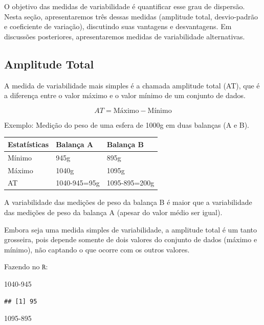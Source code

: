 \documentclass[
]{book}
\newenvironment{Shaded}{\begin{snugshade}}{\end{snugshade}}
\newcommand{\DecValTok}[1]{\textcolor[rgb]{0.00,0.00,0.81}{#1}}
\begin{document}
O objetivo das medidas de variabilidade é quantificar esse grau de dispersão. Nesta seção, apresentaremos três dessas medidas (amplitude total, desvio-padrão e coeficiente de variação), discutindo suas vantagens e desvantagens. Em discussões posteriores, apresentaremos medidas de variabilidade alternativas.

\hypertarget{amplitude-total}{%
\subsection{Amplitude Total}\label{amplitude-total}}

A medida de variabilidade mais simples é a chamada amplitude total (AT), que é a diferença entre o valor máximo e o valor mínimo de um conjunto de dados.

\begin{equation*}
AT = \text{Máximo}-\text{Mínimo}
\end{equation*}

Exemplo: Medição do peso de uma esfera de 1000g em duas balanças (A e B).

\begin{longtable}[]{@{}lll@{}}
\toprule
Estatísticas & Balança A & Balança B \\
\midrule
\endhead
Mínimo & 945g & 895g \\
Máximo & 1040g & 1095g \\
AT & 1040-945=95g & 1095-895=200g \\
\bottomrule
\end{longtable}

A variabilidade das medições de peso da balança B é maior que a variabilidade das medições de peso da balança A (apesar do valor médio ser igual).

Embora seja uma medida simples de variabilidade, a amplitude total é um tanto grosseira, pois depende somente de dois valores do conjunto de dados (máximo e mínimo), não captando o que ocorre com os outros valores.

Fazendo no \(\texttt{R}\):

\begin{Shaded}
\begin{Highlighting}[]
\DecValTok{1040{-}945}
\end{Highlighting}
\end{Shaded}

\begin{verbatim}
## [1] 95
\end{verbatim}

\begin{Shaded}
\begin{Highlighting}[]
\DecValTok{1095{-}895}
\end{Highlighting}
\end{Shaded}
\end{document}
